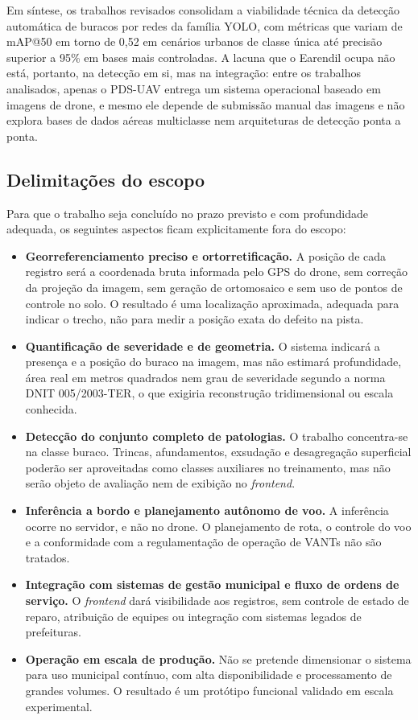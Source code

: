 \documentclass[12pt]{article}
\begin{document}
Em síntese, os trabalhos revisados consolidam a viabilidade técnica da
detecção automática de buracos por redes da família YOLO, com métricas
que variam de mAP@50 em torno de 0,52 em cenários urbanos de classe única
até precisão superior a 95\% em bases mais controladas. A lacuna que o
Earendil ocupa não está, portanto, na detecção em si, mas na integração:
entre os trabalhos analisados, apenas o PDS-UAV entrega um sistema
operacional baseado em imagens de drone, e mesmo ele depende de submissão
manual das imagens e não explora bases de dados aéreas multiclasse nem
arquiteturas de detecção ponta a ponta.

\subsection{Delimitações do escopo}
\label{sec:delimitacoes}

Para que o trabalho seja concluído no prazo previsto e com profundidade
adequada, os seguintes aspectos ficam explicitamente fora do escopo:

\begin{itemize}
  \item \textbf{Georreferenciamento preciso e ortorretificação.} A
    posição de cada registro será a coordenada bruta informada pelo GPS
    do drone, sem correção da projeção da imagem, sem geração de
    ortomosaico e sem uso de pontos de controle no solo. O resultado é
    uma localização aproximada, adequada para indicar o trecho, não para
    medir a posição exata do defeito na pista.
  \item \textbf{Quantificação de severidade e de geometria.} O sistema
    indicará a presença e a posição do buraco na imagem, mas não estimará
    profundidade, área real em metros quadrados nem grau de severidade
    segundo a norma DNIT 005/2003-TER, o que exigiria reconstrução
    tridimensional ou escala conhecida.
  \item \textbf{Detecção do conjunto completo de patologias.} O trabalho
    concentra-se na classe buraco. Trincas, afundamentos, exsudação e
    desagregação superficial poderão ser aproveitadas como classes
    auxiliares no treinamento, mas não serão objeto de avaliação nem de
    exibição no \emph{frontend}.
  \item \textbf{Inferência a bordo e planejamento autônomo de voo.} A
    inferência ocorre no servidor, e não no drone. O planejamento de
    rota, o controle do voo e a conformidade com a regulamentação de
    operação de VANTs não são tratados.
  \item \textbf{Integração com sistemas de gestão municipal e fluxo de
    ordens de serviço.} O \emph{frontend} dará visibilidade aos
    registros, sem controle de estado de reparo, atribuição de equipes ou
    integração com sistemas legados de prefeituras.
  \item \textbf{Operação em escala de produção.} Não se pretende
    dimensionar o sistema para uso municipal contínuo, com alta
    disponibilidade e processamento de grandes volumes. O resultado é um
    protótipo funcional validado em escala experimental.
\end{itemize}
\end{document}
